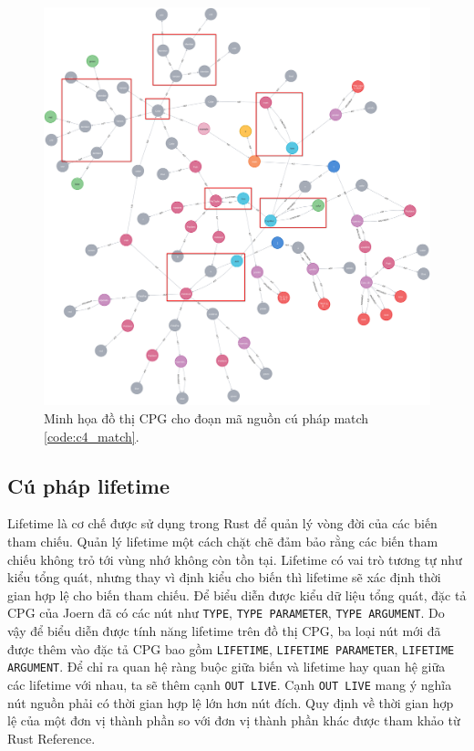 \begin{figure}[H]
    \includegraphics[width=1\columnwidth]{figures/c4.highlight/c4_match.png}
    \centering
    \caption{Minh họa đồ thị CPG cho đoạn mã nguồn cú pháp match \ref{code:c4_match}.}
    \label{img:c4_match}
\end{figure}

\subsection{Cú pháp lifetime}

Lifetime là cơ chế được sử dụng trong Rust để quản lý vòng đời của các biến tham chiếu.
Quản lý lifetime một cách chặt chẽ đảm bảo rằng các biến tham chiếu không trỏ tới vùng nhớ không còn tồn tại.
Lifetime có vai trò tương tự như kiểu tổng quát, nhưng thay vì định kiểu cho biến thì lifetime sẽ xác định thời gian hợp lệ cho biến tham chiếu.
Để biểu diễn được kiểu dữ liệu tổng quát, đặc tả CPG của Joern đã có các nút như \texttt{TYPE}, \texttt{TYPE PARAMETER}, \texttt{TYPE ARGUMENT}.
Do vậy để biểu diễn được tính năng lifetime trên đồ thị CPG, ba loại nút mới đã được thêm vào đặc tả CPG bao gồm \texttt{LIFETIME}, \texttt{LIFETIME PARAMETER}, \texttt{LIFETIME ARGUMENT}.
Để chỉ ra quan hệ ràng buộc giữa biến và lifetime hay quan hệ giữa các lifetime với nhau, ta sẽ thêm cạnh \texttt{OUT LIVE}.
Cạnh \texttt{OUT LIVE} mang ý nghĩa nút nguồn phải có thời gian hợp lệ lớn hơn nút đích.
Quy định về thời gian hợp lệ của một đơn vị thành phần so với đơn vị thành phần khác được tham khảo từ Rust Reference.

